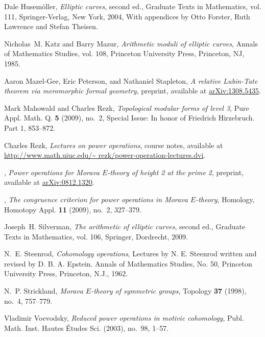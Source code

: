 \documentclass{gtpart}
\theoremstyle{definition}
\theoremstyle{remark}
\begin{document}
\begin{thebibliography}
Dale Husem{\"o}ller, \emph{Elliptic curves}, second ed., Graduate Texts in
  Mathematics, vol. 111, Springer-Verlag, New York, 2004, With appendices by
  Otto Forster, Ruth Lawrence and Stefan Theisen. 

Nicholas~M. Katz and Barry Mazur, \emph{Arithmetic moduli of elliptic curves},
  Annals of Mathematics Studies, vol. 108, Princeton University Press,
  Princeton, NJ, 1985. 

Aaron Mazel-Gee, Eric Peterson, and Nathaniel Stapleton, \emph{A relative
  {L}ubin-{T}ate theorem via meromorphic formal geometry}, preprint, available
  at \href{http://arxiv.org/abs/1308.5435}{arXiv:1308.5435}.

Mark Mahowald and Charles Rezk, \emph{Topological modular forms of level 3},
  Pure Appl. Math. Q. \textbf{5} (2009), no.~2, Special Issue: In honor of
  Friedrich Hirzebruch. Part 1, 853--872. 

Charles Rezk, \emph{Lectures on power operations}, course notes, available at
  \href{http://www.math.uiuc.edu/~rezk/power-operation-lectures.dvi}{http://www.\linebreak math.uiuc.edu/\textasciitilde
  rezk/power-operation-lectures.dvi}.

\bysame, \emph{Power operations for {M}orava ${E}$-theory of height 2 at the
  prime 2}, preprint, available at
  \href{http://arxiv.org/abs/0812.1320}{arXiv:0812.1320}.

\bysame, \emph{The congruence criterion for power operations in {M}orava
  {$E$}-theory}, Homology, Homotopy Appl. \textbf{11} (2009), no.~2, 327--379.

Joseph~H. Silverman, \emph{The arithmetic of elliptic curves}, second ed.,
  Graduate Texts in Mathematics, vol. 106, Springer, Dordrecht, 2009.

N.~E. Steenrod, \emph{Cohomology operations}, Lectures by N. E. Steenrod
  written and revised by D. B. A. Epstein. Annals of Mathematics Studies, No.
  50, Princeton University Press, Princeton, N.J., 1962. 

N.~P. Strickland, \emph{Morava {$E$}-theory of symmetric groups}, Topology
  \textbf{37} (1998), no.~4, 757--779. 

Vladimir Voevodsky, \emph{Reduced power operations in motivic cohomology},
  Publ. Math. Inst. Hautes \'Etudes Sci. (2003), no.~98, 1--57. 

\end{thebibliography}
\end{document}
